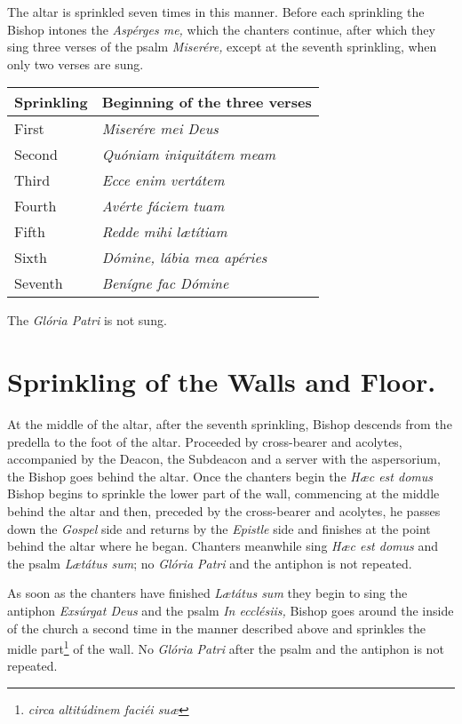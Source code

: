 \documentclass[letterpaper]{report}
\begin{document}
{    \rubric The altar is sprinkled seven times in this manner. Before each
    sprinkling the Bishop intones the \textit{Asp\'erges me,} which the
    chanters continue, after which they sing three verses of the psalm
    \textit{Miser\'ere,} except at the seventh sprinkling, when only two verses
    are sung.

    \begin{tabular}{l l}
        \toprule
        Sprinkling & Beginning of the three verses \\
        \midrule
        First   & \textit{Miserére mei Deus} \\
        Second  & \textit{Quóniam iniquitátem meam} \\
        Third   & \textit{Ecce enim vertátem} \\
        Fourth  & \textit{Avérte fáciem tuam} \\
        Fifth   & \textit{Redde mihi l\ae títiam} \\
        Sixth   & \textit{Dómine, lábia mea apéries} \\
        Seventh & \textit{Benígne fac Dómine} \\
        \bottomrule
    \end{tabular}

    The \textit{Gl\'oria Patri} is not sung.

    \section{Sprinkling of the Walls and Floor.}

    \rubric At the middle of the altar, after the seventh sprinkling, Bishop
    descends from the predella to the foot of the altar. Proceeded by
    cross-bearer and acolytes, accompanied by the Deacon, the Subdeacon and a
    server with the aspersorium, the Bishop goes behind the altar. Once the
    chanters begin the \textit{H\ae c est domus} Bishop begins to sprinkle the
    lower part of the wall, commencing at the middle behind the altar and then,
    preceded by the cross-bearer and acolytes, he passes down the
    \textit{Gospel} side and returns by the \textit{Epistle} side and finishes
    at the point behind the altar where he began. Chanters meanwhile sing
    \textit{H\ae c est domus} and the psalm \textit{L\ae tátus sum}; no
    \textit{Glória Patri} and the antiphon is not repeated.

    \rubric As soon as the chanters have finished \textit{L\ae t\'atus sum}
    they begin to sing the antiphon \textit{Exs\'urgat Deus} and the psalm
    \textit{In eccl\'esiis,} Bishop goes around the inside of the church a
    second time in the manner described above and sprinkles the midle
    part\footnote{\textit{circa altit\'udinem faci\'ei su\ae}} of the wall. No
    \textit{Glória Patri} after the psalm and the antiphon is not repeated.

}
\end{document}

